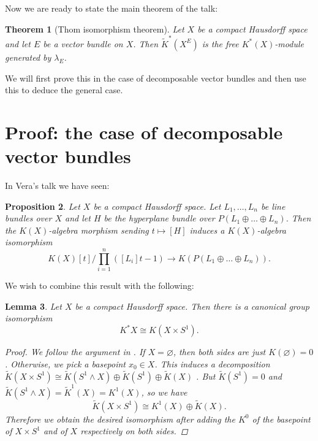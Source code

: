 \documentclass[12pt,a4paper]{amsart}
\theoremstyle{plain}
\newtheorem{thm}{Theorem}
\newtheorem{lm}[thm]{Lemma}
\newtheorem{prop}[thm]{Proposition}
\theoremstyle{definition}
\theoremstyle{remark}
\begin{document}
Now we are ready to state the main theorem of the talk:

\begin{thm}[Thom isomorphism theorem]\label{thm:thom}
  Let $X$ be a compact Hausdorff space and let $E$ be a vector bundle on $X$.
  Then $\tilde{K}^{*}(X^{E})$ is the free $K^{*}(X)$-module generated by $\lambda_{E}$.
\end{thm}

We will first prove this in the case of decomposable vector bundles and then use this to deduce the general case.

\section{Proof: the case of decomposable vector bundles}

In Vera's talk we have seen:

\begin{prop}\label{prop:sumnongraded}
  Let $X$ be a compact Hausdorff space.
  Let $L_{1}, \ldots, L_{n}$ be line bundles over $X$ and let $H$ be the hyperplane bundle over $P(L_{1} \oplus \ldots \oplus L_{n})$.
  Then the $K(X)$-algebra morphism sending $t \mapsto [H]$ induces a $K(X)$-algebra isomorphism
  \[ K(X)[t]/\prod_{i=1}^{n}([L_{i}]t - 1) \to K(P(L_{1} \oplus \ldots \oplus L_{n})). \]
\end{prop}

We wish to combine this result with the following:

\begin{lm}\label{lm:gradedvsold}
  Let $X$ be a compact Hausdorff space.
  Then there is a canonical group isomorphism
  \[ K^{*}X \cong K(X \times S^{1}). \]
  \begin{proof}
    We follow the argument in \cite[p.~38]{wir12}.
    If $X = \varnothing$, then both sides are just $K(\varnothing) = 0$.
    Otherwise, we pick a basepoint $x_{0} \in X$.
    This induces a decomposition $\tilde{K}(X \times S^{1}) \cong \tilde{K}(S^{1} \wedge X) \oplus \tilde{K}(S^{1}) \oplus \tilde{K}(X)$ \cite[Corollary 2.4.8]{ati67}.
    But $\tilde{K}(S^{1}) = 0$ and $\tilde{K}(S^{1} \wedge X) = \tilde{K}^{1}(X) = K^{1}(X)$, so we have
    \[ \tilde{K}(X \times S^{1}) \cong K^{1}(X) \oplus \tilde{K}(X). \]
    Therefore we obtain the desired isomorphism after adding the $K^{0}$ of the basepoint of $X \times S^{1}$ and of $X$ respectively on both sides.
  \end{proof}
\end{lm}
\end{document}
